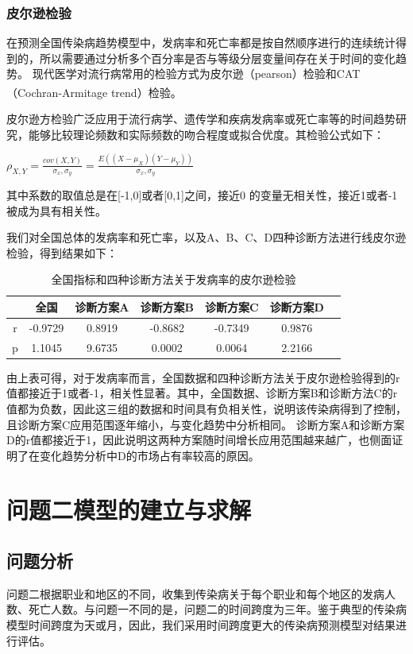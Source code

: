 \documentclass{whutmod}
\begin{document}
\subsubsection{皮尔逊检验}
在预测全国传染病趋势模型中，发病率和死亡率都是按自然顺序进行的连续统计得到的，所以需要通过分析多个百分率是否与等级分层变量间存在关于时间的变化趋势。
现代医学对流行病常用的检验方式为皮尔逊（pearson）检验和CAT（Cochran-Armitage trend）检验\textsuperscript{\cite{bib:three}}。

皮尔逊方检验广泛应用于流行病学、遗传学和疾病发病率或死亡率等的时间趋势研究，能够比较理论频数和实际频数的吻合程度或拟合优度。其检验公式如下：
\centerline{\large{$\rho_{X,Y}=\frac{cov(X,Y)}{\sigma_x,\sigma_y}=\frac{E((X-\mu_X)(Y-\mu_Y))}{\sigma_x,\sigma_y}$}}
其中系数的取值总是在[-1,0]或者[0,1]之间，接近0 的变量无相关性，接近1或者-1被成为具有相关性。

我们对全国总体的发病率和死亡率，以及A、B、C、D四种诊断方法进行线皮尔逊检验，得到结果如下：
\begin{table}[H]
    \caption{全国指标和四种诊断方法关于发病率的皮尔逊检验} \centering
    \begin{tabular*}{13cm}{ccccccc}
    \toprule[1.5pt]
     & 全国 & 诊断方案A & 诊断方案B & 诊断方案C & 诊断方案D \\
     \midrule[1pt]
     r & -0.9729 & 0.8919 & -0.8682 & -0.7349 & 0.9876 \\
     p & 1.1045 & 9.6735 & 0.0002 & 0.0064 & 2.2166 \\
     \bottomrule[1.5pt]
    \end{tabular*}
\end{table}
由上表可得，对于发病率而言，全国数据和四种诊断方法关于皮尔逊检验得到的r值都接近于1或者-1，相关性显著。其中，全国数据、诊断方案B和诊断方法C的r值都为负数，因此这三组的数据和时间具有负相关性，说明该传染病得到了控制，且诊断方案C应用范围逐年缩小，与变化趋势中分析相同。
诊断方案A和诊断方案D的r值都接近于1，因此说明这两种方案随时间增长应用范围越来越广，也侧面证明了在变化趋势分析中D的市场占有率较高的原因。

\section{问题二模型的建立与求解}
\subsection{问题分析}
问题二根据职业和地区的不同，收集到传染病关于每个职业和每个地区的发病人数、死亡人数。与问题一不同的是，问题二的时间跨度为三年。鉴于典型的传染病模型时间跨度为天或月，因此，我们采用时间跨度更大的传染病预测模型对结果进行评估。
\end{document}
